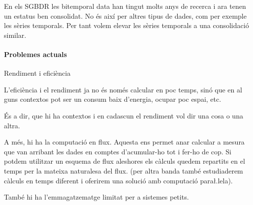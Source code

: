 En els SGBDR les bitemporal data han tingut molts anys de recerca i ara tenen un estatus ben consolidat. No és així per altres tipus de dades, com per exemple les sèries temporals. Per tant volem elevar les sèries temporals a una consolidació similar.







\paragraph{Problemes actuals}


Rendiment i eficiència

L'eficiència i el rendiment ja no és només calcular en poc temps, sinó que en al
guns contextos pot ser un consum baix d'energia, ocupar poc espai, etc.

És a dir, que hi ha contextos i en cadascun el rendiment vol dir una cosa o una 
altra.


A més, hi ha la computació en flux. Aquesta ens permet anar calcular a mesura que van arribant les dades en comptes d'acumular-ho tot i fer-ho de cop. Si potdem utilitzar un esquema de flux aleshores els càlculs quedem repartits en el temps per la mateixa naturalesa del flux. (per altra banda també estudiaderem càlculs en temps diferent i oferirem una solució amb computació para\l.lela).


També hi ha l'emmagatzematge limitat per a sistemes petits.




